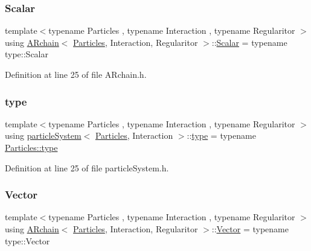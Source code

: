 \subsubsection{\texorpdfstring{Scalar}{Scalar}}
{\footnotesize\ttfamily template$<$typename Particles , typename Interaction , typename Regularitor $>$ \\
using \mbox{\hyperlink{class_a_rchain}{A\+Rchain}}$<$ \mbox{\hyperlink{struct_particles}{Particles}}, Interaction, Regularitor $>$\+::\mbox{\hyperlink{class_a_rchain_a048c8855064f452c7d6d061531a084ed}{Scalar}} =  typename type\+::\+Scalar}



Definition at line 25 of file A\+Rchain.\+h.

\mbox{\label{class_a_rchain_a7919ed2c8b419f26da20a3bd43ba5fcd}} 
\subsubsection{\texorpdfstring{type}{type}}
{\footnotesize\ttfamily template$<$typename Particles , typename Interaction , typename Regularitor $>$ \\
using \mbox{\hyperlink{classparticle_system}{particle\+System}}$<$ \mbox{\hyperlink{struct_particles}{Particles}}, Interaction $>$\+::\mbox{\hyperlink{classparticle_system_a7919ed2c8b419f26da20a3bd43ba5fcd}{type}} =  typename \mbox{\hyperlink{class_vel_indep_particles_a0c62b43c2f0a50565e5e06587fddee18}{Particles\+::type}}}



Definition at line 25 of file particle\+System.\+h.

\mbox{\label{class_a_rchain_a985f967708536cea258613bcc1147c78}} 
\subsubsection{\texorpdfstring{Vector}{Vector}}
{\footnotesize\ttfamily template$<$typename Particles , typename Interaction , typename Regularitor $>$ \\
using \mbox{\hyperlink{class_a_rchain}{A\+Rchain}}$<$ \mbox{\hyperlink{struct_particles}{Particles}}, Interaction, Regularitor $>$\+::\mbox{\hyperlink{class_a_rchain_a985f967708536cea258613bcc1147c78}{Vector}} =  typename type\+::\+Vector}



